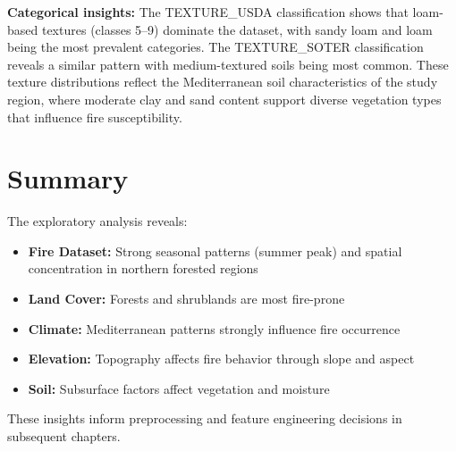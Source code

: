 \textbf{Categorical insights:} The TEXTURE\_USDA classification shows that loam-based textures (classes 5--9) dominate the dataset, with sandy loam and loam being the most prevalent categories. The TEXTURE\_SOTER classification reveals a similar pattern with medium-textured soils being most common. These texture distributions reflect the Mediterranean soil characteristics of the study region, where moderate clay and sand content support diverse vegetation types that influence fire susceptibility.

\section{Summary}
The exploratory analysis reveals:
\begin{itemize}
    \item \textbf{Fire Dataset:} Strong seasonal patterns (summer peak) and spatial concentration in northern forested regions
    \item \textbf{Land Cover:} Forests and shrublands are most fire-prone
    \item \textbf{Climate:} Mediterranean patterns strongly influence fire occurrence
    \item \textbf{Elevation:} Topography affects fire behavior through slope and aspect
    \item \textbf{Soil:} Subsurface factors affect vegetation and moisture
\end{itemize}

These insights inform preprocessing and feature engineering decisions in subsequent chapters.
